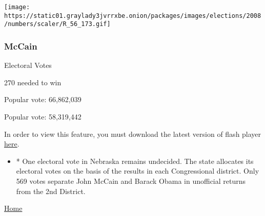\texttt{[image: https://static01.graylady3jvrrxbe.onion/packages/images/elections/2008/numbers/scaler/R\_56\_173.gif]}

\hypertarget{mccain}{%
\subsubsection{McCain}\label{mccain}}

Electoral Votes

 270 needed to win

Popular vote: 66,862,039

Popular vote: 58,319,442

In order to view this feature, you must download the latest version of
flash player
\href{//www.adobe.com/shockwave/download/download.cgi?P1_Prod_Version=ShockwaveFlash}{here}.

\begin{itemize}
\tightlist
\item
  * One electoral vote in Nebraska remains undecided. The state
  allocates its electoral votes on the basis of the results in each
  Congressional district. Only 569 votes separate John McCain and Barack
  Obama in unofficial returns from the 2nd District.
\end{itemize}

\href{//www.nytimes3xbfgragh.onion}{Home}

